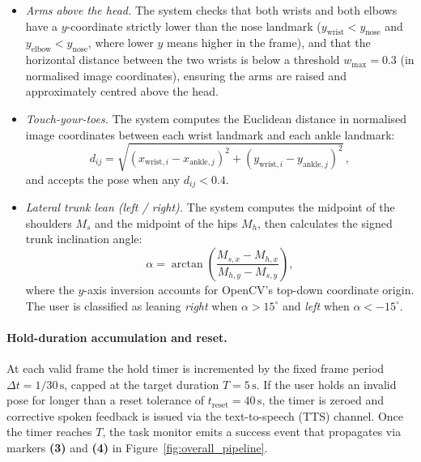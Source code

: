 \documentclass[pdflatex,sn-basic,Numbered,iicol,twocolumn]{sn-jnl}%
\begin{document}
\begin{itemize}
\item \textit{Arms above the head.} The system checks that both wrists and both elbows have a $y$-coordinate strictly lower than the nose landmark ($y_\text{wrist} < y_\text{nose}$ and $y_\text{elbow} < y_\text{nose}$, where lower $y$ means higher in the frame), and that the horizontal distance between the two wrists is below a threshold $w_\text{max} = 0.3$ (in normalised image coordinates), ensuring the arms are raised and approximately centred above the head.

\item \textit{Touch-your-toes.} The system computes the Euclidean distance in normalised image coordinates between each wrist landmark and each ankle landmark:
\begin{equation}
d_{ij} = \sqrt{(x_{\text{wrist},i} - x_{\text{ankle},j})^2 + (y_{\text{wrist},i} - y_{\text{ankle},j})^2}\,,
\label{eq:toe_distance}
\end{equation}
and accepts the pose when any $d_{ij} < 0.4$.

\item \textit{Lateral trunk lean (left / right).} The system computes the midpoint of the shoulders $M_s$ and the midpoint of the hips $M_h$, then calculates the signed trunk inclination angle:
\begin{equation}
\alpha = \arctan\!\left(\frac{M_{s,x} - M_{h,x}}{M_{h,y} - M_{s,y}}\right),
\label{eq:trunk_angle}
\end{equation}
where the $y$-axis inversion accounts for OpenCV's top-down coordinate origin. The user is classified as leaning \textit{right} when $\alpha > 15^\circ$ and \textit{left} when $\alpha < -15^\circ$.
\end{itemize}

\paragraph{Hold-duration accumulation and reset.}
At each valid frame the hold timer is incremented by the fixed frame period $\Delta t = 1/30\,\text{s}$, capped at the target duration $T = 5\,\text{s}$. If the user holds an invalid pose for longer than a reset tolerance of $t_\text{reset} = 40\,\text{s}$, the timer is zeroed and corrective spoken feedback is issued via the text-to-speech (TTS) channel. Once the timer reaches $T$, the task monitor emits a success event that propagates via markers \textbf{(3)} and \textbf{(4)} in Figure~\ref{fig:overall_pipeline}.
\end{document}
